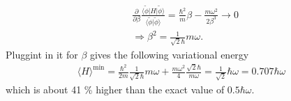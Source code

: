 \documentclass{jlreq}
\begin{document}
\begin{align}
    &\frac{\partial}{\partial\beta}\frac{\langle\tilde{\phi}|H|\tilde{\phi}\rangle}{\langle\tilde{\phi}|\tilde{\phi}\rangle}=\frac{\hbar^2}{m}\beta-\frac{m\omega^2}{2\beta^3}\rightarrow 0 \\
    &\Rightarrow \beta^2=\frac{1}{\sqrt{2}\hbar}m\omega.
\end{align}
Pluggint in it for $\beta$ gives the following variational energy
\begin{align}
    \langle H\rangle^\text{min}=\frac{\hbar^2}{2m}\frac{1}{\sqrt{2}\hbar}m\omega+\frac{m\omega^2}{4} \frac{\sqrt{2}\hbar}{m\omega}=\frac{1}{\sqrt{2}}\hbar\omega=0.707\hbar\omega
\end{align}
which is about 41 \% higher than the exact value of $0.5\hbar\omega$.
\end{document}
